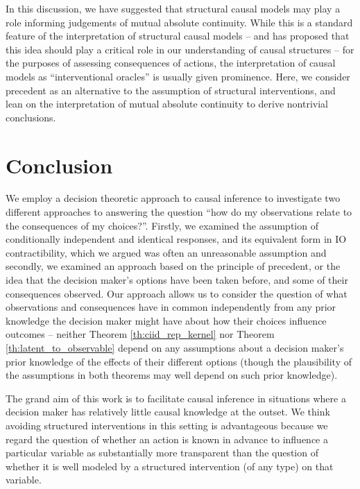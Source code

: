 {In this discussion, we have suggested that structural causal models may play a role informing judgements of mutual absolute continuity. While this is a standard feature of the interpretation of structural causal models -- and \citet{lemeire_replacing_2013} has proposed that this idea should play a critical role in our understanding of causal structures -- for the purposes of assessing consequences of actions, the interpretation of causal models as ``interventional oracles'' \citep[Section 1.3.1]{pearl_causality:_2009} is usually given prominence. Here, we consider precedent as an alternative to the assumption of structural interventions, and lean on the interpretation of mutual absolute continuity to derive nontrivial conclusions.

\section{Conclusion}

We employ a decision theoretic approach to causal inference to investigate two different approaches to answering the question ``how do my observations relate to the consequences of my choices?''. Firstly, we examined the assumption of conditionally independent and identical responses, and its equivalent form in IO contractibility, which we argued was often an unreasonable assumption and secondly, we examined an approach based on the principle of precedent, or the idea that the decision maker's options have been taken before, and some of their consequences observed. Our approach allows us to consider the question of what observations and consequences have in common independently from any prior knowledge the decision maker might have about how their choices influence outcomes -- neither Theorem \ref{th:ciid_rep_kernel} nor Theorem \ref{th:latent_to_observable} depend on any assumptions about a decision maker's prior knowledge of the effects of their different options (though the plausibility of the assumptions in both theorems may well depend on such prior knowledge).

The grand aim of this work is to facilitate causal inference in situations where a decision maker has relatively little causal knowledge at the outset. We think avoiding structured interventions in this setting is advantageous because we regard the question of whether an action is known in advance to influence a particular variable as substantially more transparent than the question of whether it is well modeled by a structured intervention (of any type) on that variable.

}
